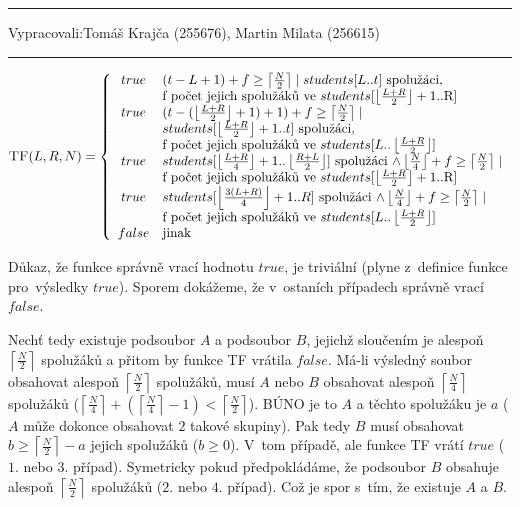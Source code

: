 \documentclass[12pt]{article}
\newcommand{\ceil}[2]{\left\lceil\frac{#1}{#2}\right\rceil}
\newcommand{\floor}[2]{\left\lfloor\frac{#1}{#2}\right\rfloor}
\newcommand{\zadani}[2]{
{\large
\noindent {\bf IB108 \hfill{} Sada #1, Příklad #2 \\[-4mm]}
\noindent\hrule
\vspace{2mm}
\noindent Vypracovali:\hfill{}Tomáš Krajča (255676), Martin Milata (256615)
\vspace{3mm}
\hrule
\bigskip\bigskip}
}
\begin{document}
\clearpage
\zadani{2}{1}

\begin{equation*}
\textsc{TF}(L,R,N) = \left\{
	\begin{array}{cl}
	true & \text{$(t-L+1)+f \geq \left\lceil\frac{N}{2}\right\rceil \mid
	students[L..t]$ spolužáci,} \\ 
	& \text{f počet jejich spolužáků ve
	$students[\left\lfloor\frac{L+R}{2}\right\rfloor+1$..R]}\\

	true & \text{$(t-(\floor{L+R}{2}+1)+1)+f \geq
	\left\lceil\frac{N}{2}\right\rceil \mid$}\\
	&\text{$students[\floor{L+R}{2}+1..t$] spolužáci,} \\ 
	& \text{f počet jejich spolužáků ve
	$students[L..\left\lfloor\frac{L+R}{2}\right\rfloor$]}\\

	true &
	\text{$students[\left\lfloor\frac{L+R}{4}\right\rfloor+1..\floor{R+L}{2}]
	$ spolužáci $\wedge \floor{N}{4}+f \geq \left\lceil\frac{N}{2}\right\rceil \mid$}\\
	& \text{f počet jejich spolužáků ve
	$students[\left\lfloor\frac{L+R}{2}\right\rfloor+1$..R]}\\

	true & \text{$students[\left\lfloor\frac{3(L+R)}{4}\right\rfloor+1..R]
	$ spolužáci $\wedge \floor{N}{4}+f \geq \left\lceil\frac{N}{2}\right\rceil \mid$}\\
	& \text{f počet jejich spolužáků ve
	$students[L..\floor{L+R}{2}$]}\\

	false & \text{jinak}
	\end{array} \right.
\end{equation*}

\noindent
Důkaz, že funkce správně vrací hodnotu $true$, je triviální (plyne z~definice
funkce pro~výsledky $true$). Sporem dokážeme, že v~ostaních případech správně
vrací $false$. 

\noindent
Nechť tedy existuje podsoubor $A$ a podsoubor $B$, jejichž sloučením je
alespoň $\ceil{N}{2}$ spolužáků a přitom by funkce \textsc{TF} vrátila $false$. Má-li
výsledný soubor obsahovat alespoň $\ceil{N}{2}$ spolužáků, musí $A$ nebo $B$ obsahovat
alespoň $\ceil{N}{4}$ spolužáků ($\ceil{N}{4}+(\ceil{N}{4}-1)<\ceil{N}{2}$).
BÚNO je to $A$ a těchto spolužáku je $a$ ($A$ může dokonce obsahovat $2$ takové
skupiny). Pak tedy $B$ musí obsahovat $b \geq
\ceil{N}{2}-a$ jejich spolužáků ($b \geq 0$). V~tom případě, ale funkce
\textsc{TF}
vrátí $true$ ($1.$ nebo $3.$ případ). Symetricky pokud předpokládáme, že
podsoubor $B$
obsahuje alespoň $\ceil{N}{2}$ spolužáků ($2.$ nebo $4.$ případ). Což je
spor s~tím, že existuje $A$ a $B$.
\end{document}
